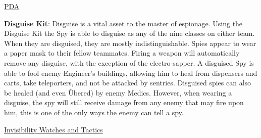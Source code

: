 \newpage

\begin {center}
\underline {PDA}
\end {center}

{\bf Disguise Kit}: Disguise is a vital asset to the master of espionage.  Using the Disguise Kit the Spy is able to disguise as any of the nine classes on either team. When they are disguised, they are mostly indistinguishable.  Spies appear to wear a paper mask to their fellow teammates. Firing a weapon will automatically remove any disguise, with the exception of the electro-sapper. A disguised Spy is able to fool enemy Engineer's buildings, allowing him to heal from dispensers and carts, take teleporters, and not be attacked by sentries.  Disguised spies can also be healed (and even Übered) by enemy Medics. However, when wearing a disguise, the spy will still receive damage from any enemy that may fire upon him, this is one of the only ways the enemy can tell a spy.

\begin {center}
\underline {Invisibility Watches and Tactics}
\end {center}

